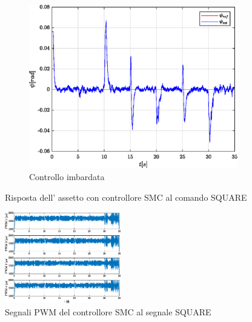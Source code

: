 \begin{figure}
	\hfill
	\begin{subfigure}{0.45\textwidth}
		\centering
		\includegraphics[width=1\textwidth]{Simulazioni/Figure/SMC/SQUARE/AttitudeControlYaw}
		\caption{Controllo imbardata}
		\label{fig:SQUAREyawSMC}
	\end{subfigure}
	\caption{Risposta dell' assetto con controllore SMC al comando SQUARE}
\end{figure}


\begin{figure}
	\centering
	\includegraphics[width=0.45\textwidth]{Simulazioni/Figure/SMC/SQUARE/PWM}
	\caption{Segnali PWM del controllore SMC al segnale SQUARE}
	\label{fig:SQUAREPWMSMC}
\end{figure}


